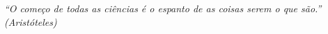 %
%

\begin{epigrafe}

\textit{``O começo de todas as ciências é o espanto de as coisas serem o que são.'' (Aristóteles)}

\end{epigrafe}
